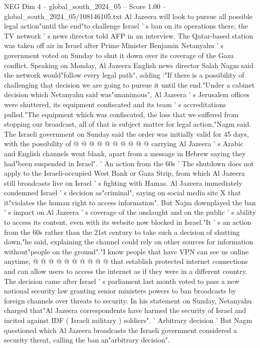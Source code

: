 \begin{textsample}{NEG Dim 4 – global\_south\_2024\_05 – Score 1.00 – global\_south\_2024\_05/108146105.txt}  \label{ex:f4_neg_251}
Al Jazeera will look to pursue all possible legal action"until the end"to challenge Israel ' s ban on its operations there, the TV network ' s news director told AFP in an interview.
The Qatar-based station was taken off air in Israel after Prime Minister Benjamin Netanyahu ' s government voted on Sunday to shut it down over its coverage of the Gaza conflict.
Speaking on Monday, Al Jazeera English news director Salah Nagm said the network would"follow every legal path", adding :"If there is a possibility of challenging that decision we are going to pursue it until the end."Under a cabinet decision which Netanyahu said was"unanimous", Al Jazeera ' s Jerusalem offices were shuttered, its equipment confiscated and its team ' s accreditations pulled."The equipment which was confiscated, the loss that we suffered from stopping our broadcast, all of that is subject matter for legal action,"Nagm said.
The Israeli government on Sunday said the order was initially valid for 45 days, with the possibility of @ @ @ @ @ @ @ @ @ @ carrying Al Jazeera ' s Arabic and English channels went blank, apart from a message in Hebrew saying they had"been suspended in Israel". ' An action from the 60s ' The shutdown does not apply to the Israeli-occupied West Bank or Gaza Strip, from which Al Jazeera still broadcasts live on Israel ' s fighting with Hamas.
Al Jazeera immediately condemned Israel ' s decision as"criminal", saying on social media site X that it"violates the human right to access information".
But Najm downplayed the ban ' s impact on Al Jazeera ' s coverage of the onslaught and on the public ' s ability to access its content, even with its website now blocked in Israel."It ' s an action from the 60s rather than the 21st century to take such a decision of shutting down,"he said, explaining the channel could rely on other sources for information without"people on the ground"."I know people that have VPN can see us online anytime, @ @ @ @ @ @ @ @ @ @ that establish protected internet connections and can allow users to access the internet as if they were in a different country.
The decision came after Israel ' s parliament last month voted to pass a new national security law granting senior ministers powers to ban broadcasts by foreign channels over threats to security.
In his statement on Sunday, Netanyahu charged that"Al Jazeera correspondents have harmed the security of Israel and incited against IDF ( Israeli military ) soldiers". ' Arbitrary decision ' But Nagm questioned which Al Jazeera broadcasts the Israeli government considered a security threat, calling the ban an"arbitrary decision".

\end{textsample}

